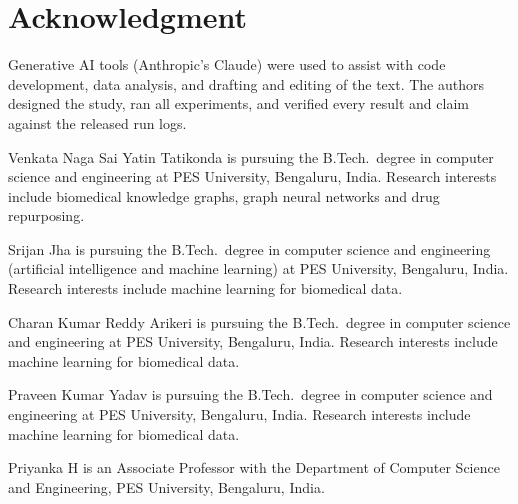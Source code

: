 \documentclass{ieeeaccess}
\begin{document}
\section*{Acknowledgment}
Generative AI tools (Anthropic's Claude) were used to assist with code development, data analysis, and drafting and editing of the text. The authors designed the study, ran all experiments, and verified every result and claim against the released run logs.




\begin{IEEEbiographynophoto}{Venkata Naga Sai Yatin Tatikonda} is pursuing the B.Tech.\ degree in computer science and engineering at PES University, Bengaluru, India. Research interests include biomedical knowledge graphs, graph neural networks and drug repurposing.
\end{IEEEbiographynophoto}

\begin{IEEEbiographynophoto}{Srijan Jha} is pursuing the B.Tech.\ degree in computer science and engineering (artificial intelligence and machine learning) at PES University, Bengaluru, India. Research interests include machine learning for biomedical data.
\end{IEEEbiographynophoto}

\begin{IEEEbiographynophoto}{Charan Kumar Reddy Arikeri} is pursuing the B.Tech.\ degree in computer science and engineering at PES University, Bengaluru, India. Research interests include machine learning for biomedical data.
\end{IEEEbiographynophoto}

\begin{IEEEbiographynophoto}{Praveen Kumar Yadav} is pursuing the B.Tech.\ degree in computer science and engineering at PES University, Bengaluru, India. Research interests include machine learning for biomedical data.
\end{IEEEbiographynophoto}

\begin{IEEEbiographynophoto}{Priyanka H} is an Associate Professor with the Department of Computer Science and Engineering, PES University, Bengaluru, India.
\end{IEEEbiographynophoto}

\vfill  %

\EOD
\end{document}
